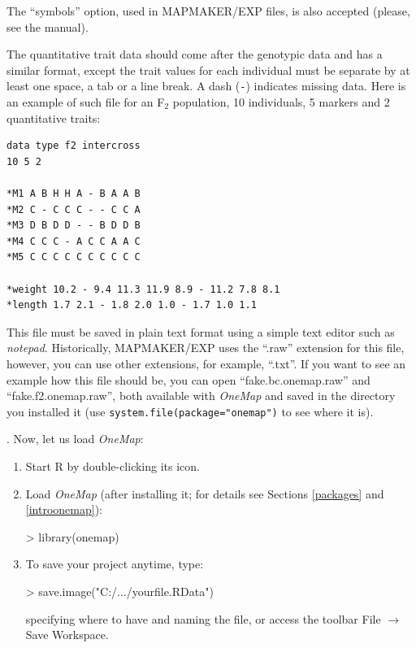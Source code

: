 \documentclass[letterpaper,12pt,oneside]{article}
\begin{document}
The ``symbols'' option, used in MAPMAKER/EXP files, is also accepted (please, see the manual). 

The quantitative trait data should come after the genotypic data and has a similar format, except the trait values for each individual must be separate by at least one space, a tab or a line break. A dash ({\tt -}) indicates missing data. Here is an example of such file for an F$_2$ population, 10 individuals, 5 markers and 2 quantitative traits:

\begin{verbatim}
data type f2 intercross
10 5 2

*M1 A B H H A - B A A B
*M2 C - C C C - - C C A
*M3 D B D D - - B D D B
*M4 C C C - A C C A A C
*M5 C C C C C C C C C C

*weight 10.2 - 9.4 11.3 11.9 8.9 - 11.2 7.8 8.1 
*length 1.7 2.1 - 1.8 2.0 1.0 - 1.7 1.0 1.1
\end{verbatim}

This file must be saved in plain text format using a simple text editor such as {\it notepad}. Historically, MAPMAKER/EXP uses the ``.raw'' extension for this file,  however, you can use other extensions, for example, ``.txt''. If you want to see an example how this file should be, you can open ``fake.bc.onemap.raw'' and ``fake.f2.onemap.raw'', both available with {\sl OneMap} and saved in the directory you installed it (use {\tt system.file(package="onemap")} to see where it is).

. Now, let us load {\sl OneMap}:

\begin{enumerate}
\item Start R by double-clicking its icon.

\item Load {\sl OneMap} (after installing it; for details see Sections \ref{packages} and \ref{introonemap}):
\begin{Schunk}
\begin{Sinput}
> library(onemap)
\end{Sinput}
\end{Schunk}

\item To save your project anytime, type:
\begin{Schunk}
\begin{Sinput}
> save.image("C:/.../yourfile.RData")
\end{Sinput}
\end{Schunk}
specifying where to have and naming the file, or access the toolbar File $\to$ Save Workspace.

\end{enumerate}
\end{document}
